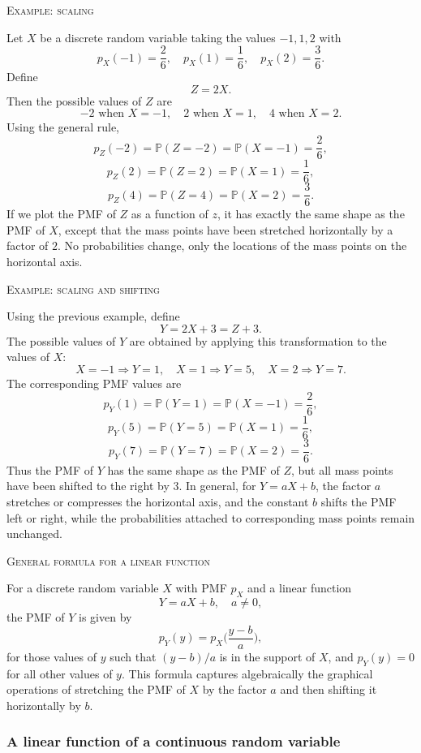 \textsc{Example: scaling}

Let \(X\) be a discrete random variable taking the values \(-1,1,2\) with
\[
p_X(-1) = \frac{2}{6},
\quad
p_X(1) = \frac{1}{6},
\quad
p_X(2) = \frac{3}{6}.
\]
Define
\[
Z = 2X.
\]
Then the possible values of \(Z\) are
\[
-2 \text{ when } X = -1,
\quad
2 \text{ when } X = 1,
\quad
4 \text{ when } X = 2.
\]
Using the general rule,
\[
p_Z(-2)
=
\mathbb{P}(Z = -2)
=
\mathbb{P}(X = -1)
=
\frac{2}{6},
\]
\[
p_Z(2)
=
\mathbb{P}(Z = 2)
=
\mathbb{P}(X = 1)
=
\frac{1}{6},
\]
\[
p_Z(4)
=
\mathbb{P}(Z = 4)
=
\mathbb{P}(X = 2)
=
\frac{3}{6}.
\]
If we plot the PMF of \(Z\) as a function of \(z\), it has exactly the same shape as the PMF of \(X\), except that the mass points have been stretched horizontally by a factor of \(2\).  
No probabilities change, only the locations of the mass points on the horizontal axis.

\textsc{Example: scaling and shifting}

Using the previous example, define
\[
Y = 2X + 3 = Z + 3.
\]
The possible values of \(Y\) are obtained by applying this transformation to the values of \(X\):
\[
X = -1 \Rightarrow Y = 1,
\quad
X = 1 \Rightarrow Y = 5,
\quad
X = 2 \Rightarrow Y = 7.
\]
The corresponding PMF values are
\[
p_Y(1)
=
\mathbb{P}(Y = 1)
=
\mathbb{P}(X = -1)
=
\frac{2}{6},
\]
\[
p_Y(5)
=
\mathbb{P}(Y = 5)
=
\mathbb{P}(X = 1)
=
\frac{1}{6},
\]
\[
p_Y(7)
=
\mathbb{P}(Y = 7)
=
\mathbb{P}(X = 2)
=
\frac{3}{6}.
\]
Thus the PMF of \(Y\) has the same shape as the PMF of \(Z\), but all mass points have been shifted to the right by \(3\).  
In general, for \(Y = aX + b\), the factor \(a\) stretches or compresses the horizontal axis, and the constant \(b\) shifts the PMF left or right, while the probabilities attached to corresponding mass points remain unchanged.

\textsc{General formula for a linear function}

For a discrete random variable \(X\) with PMF \(p_X\) and a linear function
\[
Y = aX + b,
\quad a \ne 0,
\]
the PMF of \(Y\) is given by
\[
p_Y(y)
=
p_X\Big(\frac{y - b}{a}\Big),
\]
for those values of \(y\) such that \((y - b)/a\) is in the support of \(X\), and \(p_Y(y) = 0\) for all other values of \(y\).  
This formula captures algebraically the graphical operations of stretching the PMF of \(X\) by the factor \(a\) and then shifting it horizontally by \(b\).



\subsubsection{A linear function of a continuous random variable}

